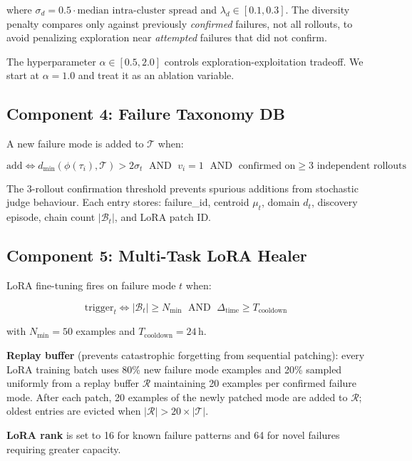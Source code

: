 \documentclass[11pt,a4paper]{article}
\begin{document}
where $\sigma_d = 0.5 \cdot \text{median intra-cluster spread}$ and
$\lambda_d \in [0.1, 0.3]$. The diversity penalty compares only against
previously \emph{confirmed} failures, not all rollouts, to avoid penalizing
exploration near \emph{attempted} failures that did not confirm.

The hyperparameter $\alpha \in [0.5, 2.0]$ controls exploration-exploitation
tradeoff. We start at $\alpha = 1.0$ and treat it as an ablation variable.

\subsection{Component 4: Failure Taxonomy DB}

A new failure mode is added to $\mathcal{T}$ when:

$$\text{add} \iff d_\text{min}(\phi(\tau_i), \mathcal{T}) > 2\sigma_t
\;\text{ AND }\; v_i = 1
\;\text{ AND }\; \text{confirmed on} \geq 3 \text{ independent rollouts}$$

The 3-rollout confirmation threshold prevents spurious additions from
stochastic judge behaviour. Each entry stores:
failure\_id, centroid $\mu_t$, domain $d_t$, discovery episode,
chain count $|\mathcal{B}_t|$, and LoRA patch ID.

\subsection{Component 5: Multi-Task LoRA Healer}

LoRA fine-tuning fires on failure mode $t$ when:

\begin{equation}
\text{trigger}_t \iff |\mathcal{B}_t| \geq N_\text{min}
\;\text{ AND }\;
\Delta_\text{time} \geq T_\text{cooldown}
\label{eq:trigger}
\end{equation}

with $N_\text{min} = 50$ examples and $T_\text{cooldown} = 24\,\text{h}$.

\textbf{Replay buffer} (prevents catastrophic forgetting from sequential
patching): every LoRA training batch uses 80\% new failure mode examples
and 20\% sampled uniformly from a replay buffer $\mathcal{R}$ maintaining
20 examples per confirmed failure mode. After each patch, 20 examples of
the newly patched mode are added to $\mathcal{R}$; oldest entries are evicted
when $|\mathcal{R}| > 20 \times |\mathcal{T}|$.

\textbf{LoRA rank} is set to 16 for known failure patterns and 64 for
novel failures requiring greater capacity.
\end{document}
